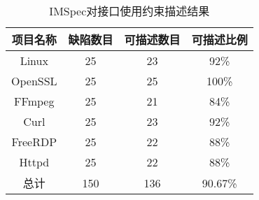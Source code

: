 \begin{table}[t]
	\centering
	\begin{minipage}[t]{0.6\linewidth} %
		\caption{IMSpec对接口使用约束描述结果}
		\label{tab:2-5-description}
			\begin{tabular}{cccc}
			\hline
			项目名称 & 缺陷数目 & 可描述数目 & 可描述比例 \\
			\hline
			Linux & 25 & 23 & 92\% \\
			OpenSSL & 25 & 25 & 100\% \\
			FFmpeg & 25 & 21 & 84\% \\
			Curl & 25 & 23 & 92\% \\
			FreeRDP & 25 & 22 & 88\% \\
			Httpd & 25 & 22 & 88\% \\
			\hline
			总计 & 150 & 136 & 90.67\% \\
			\hline
		\end{tabular}
	\end{minipage}
\end{table}